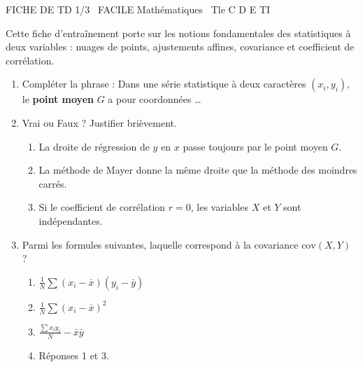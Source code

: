 \documentclass[11pt]{article}
\begin{document}
\begin{tcolorbox}[enhanced,colback=popink,colframe=popink,arc=10pt,boxrule=0pt,left=12pt,right=12pt,top=9pt,bottom=9pt]
{\color{white}\popxbold\small FICHE DE TD 1/3 \textbullet\ FACILE \hfill Mathématiques \textbullet\ Tle C D E TI\par}
\end{tcolorbox}
\vspace{4pt}
\noindent Cette fiche d'entraînement porte sur les notions fondamentales des statistiques à deux variables : nuages de points, ajustements affines, covariance et coefficient de corrélation.

\begin{exercice}
\begin{enumerate}
    \item Compléter la phrase : Dans une série statistique à deux caractères $(x_i, y_i)$, le \textbf{point moyen} $G$ a pour coordonnées \ldots
    \item Vrai ou Faux ? Justifier brièvement.
    \begin{enumerate}
        \item La droite de régression de $y$ en $x$ passe toujours par le point moyen $G$.
        \item La méthode de Mayer donne la même droite que la méthode des moindres carrés.
        \item Si le coefficient de corrélation $r = 0$, les variables $X$ et $Y$ sont indépendantes.
    \end{enumerate}
    \item Parmi les formules suivantes, laquelle correspond à la covariance $\text{cov}(X,Y)$ ?
    \begin{enumerate}
        \item $\frac{1}{N}\sum (x_i - \bar{x})(y_i - \bar{y})$
        \item $\frac{1}{N}\sum (x_i - \bar{x})^2$
        \item $\frac{\sum x_i y_i}{N} - \bar{x}\bar{y}$
        \item Réponses 1 et 3.
    \end{enumerate}
\end{enumerate}
\end{exercice}
\end{document}
